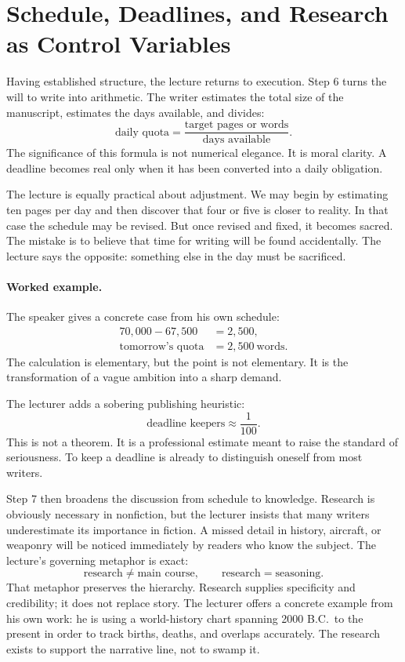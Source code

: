 \section{Schedule, Deadlines, and Research as Control Variables}

Having established structure, the lecture returns to execution. Step 6 turns the will to write into arithmetic. The writer estimates the total size of the manuscript, estimates the days available, and divides:
\begin{equation}
\text{daily quota} = \frac{\text{target pages or words}}{\text{days available}}.
\end{equation}
The significance of this formula is not numerical elegance. It is moral clarity. A deadline becomes real only when it has been converted into a daily obligation.

The lecture is equally practical about adjustment. We may begin by estimating ten pages per day and then discover that four or five is closer to reality. In that case the schedule may be revised. But once revised and fixed, it becomes sacred. The mistake is to believe that time for writing will be found accidentally. The lecture says the opposite: something else in the day must be sacrificed.

\paragraph{Worked example.} The speaker gives a concrete case from his own schedule:
\begin{align}
70{,}000 - 67{,}500 &= 2{,}500,\\
\text{tomorrow's quota} &= 2{,}500\ \text{words}.
\end{align}
The calculation is elementary, but the point is not elementary. It is the transformation of a vague ambition into a sharp demand.

The lecturer adds a sobering publishing heuristic:
\begin{equation}
\text{deadline keepers} \approx \frac{1}{100}.
\end{equation}
This is not a theorem. It is a professional estimate meant to raise the standard of seriousness. To keep a deadline is already to distinguish oneself from most writers.

Step 7 then broadens the discussion from schedule to knowledge. Research is obviously necessary in nonfiction, but the lecturer insists that many writers underestimate its importance in fiction. A missed detail in history, aircraft, or weaponry will be noticed immediately by readers who know the subject. The lecture's governing metaphor is exact:
\begin{equation}
\text{research} \neq \text{main course}, \qquad
\text{research} = \text{seasoning}.
\end{equation}
That metaphor preserves the hierarchy. Research supplies specificity and credibility; it does not replace story. The lecturer offers a concrete example from his own work: he is using a world-history chart spanning 2000 B.C.\ to the present in order to track births, deaths, and overlaps accurately. The research exists to support the narrative line, not to swamp it.


